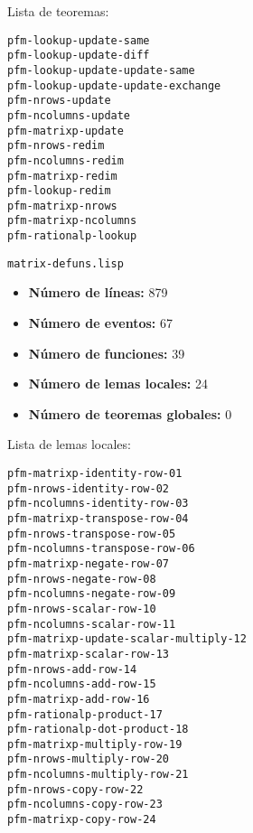 \documentclass[a4paper,10pt]{article}
\begin{document}
\par \vspace{10pt}

Lista de teoremas:

\par \vspace{10pt}

\begin{lstlisting}[language=clips]
pfm-lookup-update-same
pfm-lookup-update-diff
pfm-lookup-update-update-same 
pfm-lookup-update-update-exchange
pfm-nrows-update
pfm-ncolumns-update
pfm-matrixp-update
pfm-nrows-redim  
pfm-ncolumns-redim
pfm-matrixp-redim
pfm-lookup-redim
pfm-matrixp-nrows
pfm-matrixp-ncolumns
pfm-rationalp-lookup
\end{lstlisting}

\par \vspace{24pt}
\texttt{matrix-defuns.lisp}

\par \vspace{10pt}

\begin{itemize}
	\item \textbf{Número de líneas:} 879 
	\item \textbf{Número de eventos:} 67
	\item \textbf{Número de funciones:} 39
	\item \textbf{Número de lemas locales:} 24
	\item \textbf{Número de teoremas globales:} 0
\end{itemize}

\par \vspace{10pt}

Lista de lemas locales:

\par \vspace{10pt}

\begin{lstlisting}[language=clips]
pfm-matrixp-identity-row-01
pfm-nrows-identity-row-02
pfm-ncolumns-identity-row-03
pfm-matrixp-transpose-row-04
pfm-nrows-transpose-row-05
pfm-ncolumns-transpose-row-06
pfm-matrixp-negate-row-07
pfm-nrows-negate-row-08
pfm-ncolumns-negate-row-09
pfm-nrows-scalar-row-10
pfm-ncolumns-scalar-row-11
pfm-matrixp-update-scalar-multiply-12
pfm-matrixp-scalar-row-13
pfm-nrows-add-row-14
pfm-ncolumns-add-row-15
pfm-matrixp-add-row-16
pfm-rationalp-product-17
pfm-rationalp-dot-product-18
pfm-matrixp-multiply-row-19
pfm-nrows-multiply-row-20
pfm-ncolumns-multiply-row-21
pfm-nrows-copy-row-22
pfm-ncolumns-copy-row-23
pfm-matrixp-copy-row-24
\end{lstlisting}
\end{document}
